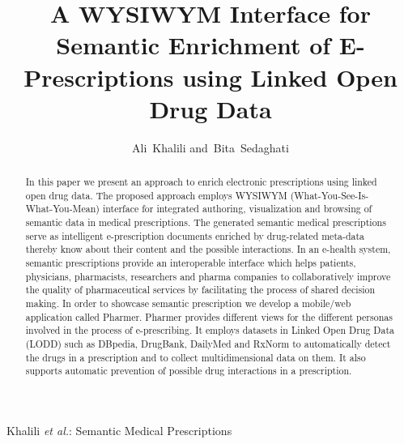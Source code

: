 \documentclass[journal]{IEEEtran}
\begin{document}
%
\title{A WYSIWYM Interface for Semantic Enrichment of E-Prescriptions using Linked Open Drug Data}

\author{Ali~Khalili
        and~Bita~Sedaghati
}


%
{Khalili \MakeLowercase{\textit{et al.}}: Semantic Medical Prescriptions}
%

\maketitle


\begin{abstract}
In this paper we present an approach to enrich electronic prescriptions using linked open drug data.
The proposed approach employs WYSIWYM (What-You-See-Is-What-You-Mean) interface for integrated authoring, visualization and browsing of semantic data in medical prescriptions.
The generated semantic medical prescriptions serve as intelligent e-prescription documents enriched by drug-related meta-data thereby know about their content and the possible interactions.
In an e-health system, semantic prescriptions provide an interoperable interface which helps patients, physicians, pharmacists, researchers and pharma companies to collaboratively improve the quality of pharmaceutical services by facilitating the process of shared decision making.
In order to showcase semantic prescription we develop a mobile/web application called Pharmer.
Pharmer provides different views for the different personas involved in the process of e-prescribing.
It employs datasets in Linked Open Drug Data (LODD) such as DBpedia, DrugBank, DailyMed and RxNorm to automatically detect the drugs in a prescription and to collect multidimensional data on them.
It also supports automatic prevention of possible drug interactions in a prescription.
\end{abstract}
\end{document}
